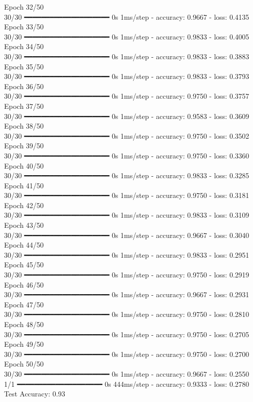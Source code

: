 \documentclass{article}
\begin{document}
Epoch 32/50 \\
30/30 ━━━━━━━━━━━━━━━━━━━━ 0s 1ms/step - accuracy: 0.9667 - loss: 0.4135 \\
Epoch 33/50 \\
30/30 ━━━━━━━━━━━━━━━━━━━━ 0s 1ms/step - accuracy: 0.9833 - loss: 0.4005 \\
Epoch 34/50 \\
30/30 ━━━━━━━━━━━━━━━━━━━━ 0s 1ms/step - accuracy: 0.9833 - loss: 0.3883 \\
Epoch 35/50 \\
30/30 ━━━━━━━━━━━━━━━━━━━━ 0s 1ms/step - accuracy: 0.9833 - loss: 0.3793 \\
Epoch 36/50 \\
30/30 ━━━━━━━━━━━━━━━━━━━━ 0s 1ms/step - accuracy: 0.9750 - loss: 0.3757 \\
Epoch 37/50 \\
30/30 ━━━━━━━━━━━━━━━━━━━━ 0s 1ms/step - accuracy: 0.9583 - loss: 0.3609 \\
Epoch 38/50 \\
30/30 ━━━━━━━━━━━━━━━━━━━━ 0s 1ms/step - accuracy: 0.9750 - loss: 0.3502 \\
Epoch 39/50 \\
30/30 ━━━━━━━━━━━━━━━━━━━━ 0s 1ms/step - accuracy: 0.9750 - loss: 0.3360 \\
Epoch 40/50 \\
30/30 ━━━━━━━━━━━━━━━━━━━━ 0s 1ms/step - accuracy: 0.9833 - loss: 0.3285 \\
Epoch 41/50 \\
30/30 ━━━━━━━━━━━━━━━━━━━━ 0s 1ms/step - accuracy: 0.9750 - loss: 0.3181 \\
Epoch 42/50 \\
30/30 ━━━━━━━━━━━━━━━━━━━━ 0s 1ms/step - accuracy: 0.9833 - loss: 0.3109 \\
Epoch 43/50 \\
30/30 ━━━━━━━━━━━━━━━━━━━━ 0s 1ms/step - accuracy: 0.9667 - loss: 0.3040 \\
Epoch 44/50 \\
30/30 ━━━━━━━━━━━━━━━━━━━━ 0s 1ms/step - accuracy: 0.9833 - loss: 0.2951 \\
Epoch 45/50 \\
30/30 ━━━━━━━━━━━━━━━━━━━━ 0s 1ms/step - accuracy: 0.9750 - loss: 0.2919 \\
Epoch 46/50 \\
30/30 ━━━━━━━━━━━━━━━━━━━━ 0s 1ms/step - accuracy: 0.9667 - loss: 0.2931 \\
Epoch 47/50 \\
30/30 ━━━━━━━━━━━━━━━━━━━━ 0s 1ms/step - accuracy: 0.9750 - loss: 0.2810 \\
Epoch 48/50 \\
30/30 ━━━━━━━━━━━━━━━━━━━━ 0s 1ms/step - accuracy: 0.9750 - loss: 0.2705 \\
Epoch 49/50 \\
30/30 ━━━━━━━━━━━━━━━━━━━━ 0s 1ms/step - accuracy: 0.9750 - loss: 0.2700 \\
Epoch 50/50 \\
30/30 ━━━━━━━━━━━━━━━━━━━━ 0s 1ms/step - accuracy: 0.9667 - loss: 0.2550 \\
1/1 ━━━━━━━━━━━━━━━━━━━━ 0s 444ms/step - accuracy: 0.9333 - loss: 0.2780 \\
Test Accuracy: 0.93
\end{document}
